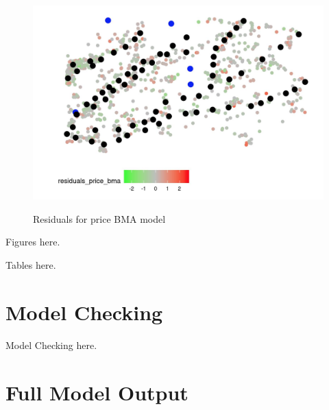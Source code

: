 \documentclass[10pt]{jmlr}%
\begin{document}
\begin{figure}[htbp]
	\centering
	\caption{Residuals for price BMA model}
	\includegraphics[width=0.5\linewidth]{residual_map_price.png}
	\label{fig:map_residuals}
\end{figure}

Figures here.

Tables here.

\newpage  %

\section{Model Checking}
\label{appendix:assumption}

Model Checking here.

\section{Full Model Output}





\end{document}
